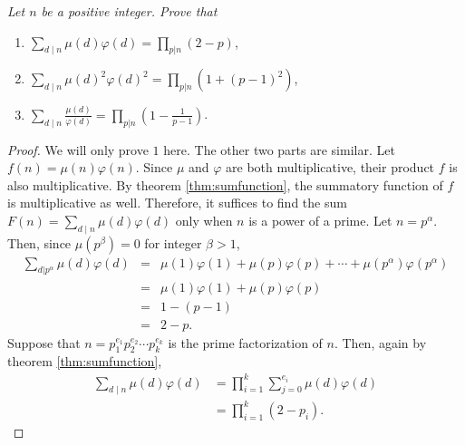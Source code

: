 \documentclass[12pt]{subfile}
\begin{document}
		\begin{theorem}\slshape
			Let $n$ be a positive integer. Prove that
			\begin{enumerate}
				\item $\displaystyle \sum_{d\mid n}\mu(d)\varphi(d) = \prod_{p|n} (2-p)$,
				\item $\displaystyle \sum_{d\mid n}\mu(d)^2\varphi(d)^2=\prod_{p|n}(1+(p-1)^2)$,
				\item $\displaystyle \sum_{d\mid n}\frac{\mu(d)}{\varphi(d)} = \prod_{p|n}\left(1-\frac{1}{p-1}\right)$.
			\end{enumerate}
		\end{theorem}

		\begin{proof}
			We will only prove $1$ here. The other two parts are similar. Let $f(n)=\mu(n)\varphi(n)$. Since $\mu$ and $\varphi$ are both multiplicative, their product $f$ is also multiplicative. By theorem \ref{thm:sumfunction}, the summatory function of $f$ is multiplicative as well. Therefore, it suffices to find the sum $F(n)=\sum\limits_{d\mid n}\mu(d)\varphi(d)$ only when $n$ is a power of a prime. Let $n=p^\alpha$. Then, since $\mu(p^\beta)=0$ for integer $\beta > 1$,
				\begin{eqnarray*}
				\sum\limits_{d|p^\alpha}\mu(d)\varphi(d)
					&=& \mu(1)\varphi(1) + \mu(p) \varphi(p) + \cdots + \mu(p^\alpha) \varphi(p^\alpha)\\
					&=& \mu(1)\varphi(1) + \mu(p) \varphi(p) \\
					&=& 1 - (p-1)\\
					&=& 2 - p.
				\end{eqnarray*}
			Suppose that $n=p_1^{e_1}p_2^{e_2} \cdots p_k^{e_k}$ is the prime factorization of $n$. Then, again by theorem \ref{thm:sumfunction},
			\begin{align*}
			\sum\limits_{d\mid n}\mu(d)\varphi(d) &= \prod_{i=1}^{k}\sum\limits_{j=0}^{e_i}\mu(d)\varphi(d)\\
			&= \prod_{i=1}^{k} (2-p_i).
			\end{align*}
		\end{proof}
\end{document}
